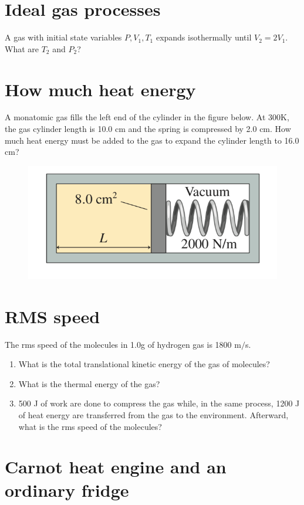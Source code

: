 \documentclass[12pt]{article}
\begin{document}
\newpage
\section{Ideal gas processes}

A gas with initial state variables $P, V_1, T_1$ expands isothermally until $V_2 = 2V_1$. What are $T_2$ and $P_2$?

\newpage
\section{How much heat energy}

A monatomic gas fills the left end of the cylinder in the figure below. At 300K, the gas cylinder length is 10.0 cm and the spring is compressed by 2.0 cm. How much heat energy must be added to the gas to expand the cylinder length to 16.0 cm?

\begin{figure}[h!]
\centering
\includegraphics[width=0.5\linewidth]{Final_2}
\end{figure}


\newpage
\section{RMS speed}

The rms speed of the molecules in 1.0g of hydrogen gas is 1800 m$/$s.
\begin{enumerate}
\item What is the total translational kinetic energy of the gas of molecules?
\item What is the thermal energy of the gas?
\item 500 J of work are done to compress the gas while, in the same process, 1200 J of heat energy are transferred from the gas to the environment. Afterward, what is the rms speed of the molecules?
\end{enumerate}




\newpage
\section{Carnot heat engine and an ordinary fridge}
\end{document}

